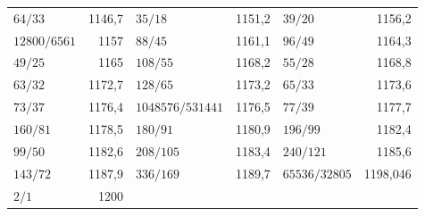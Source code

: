 {\begin{longtable}{l r @{\qquad} l r @{\qquad} l r}
$64/33$ & 1146{,}7 & $35/18$ & 1151{,}2 & $39/20$ & 1156{,}2 \\
$12800/6561$ & 1157 & $88/45$ & 1161{,}1 & $96/49$ & 1164{,}3 \\
$49/25$ & 1165 & $108/55$ & 1168{,}2 & $55/28$ & 1168{,}8 \\
$63/32$ & 1172{,}7 & $128/65$ & 1173{,}2 & $65/33$ & 1173{,}6 \\
$73/37$ & 1176{,}4 & $1048576/531441$ & 1176{,}5 & $77/39$ & 1177{,}7 \\
$160/81$ & 1178{,}5 & $180/91$ & 1180{,}9 & $196/99$ & 1182{,}4 \\
$99/50$ & 1182{,}6 & $208/105$ & 1183{,}4 & $240/121$ & 1185{,}6 \\
$143/72$ & 1187{,}9 & $336/169$ & 1189{,}7 & $65536/32805$ & 1198{,}046 \\
$2/1$ & 1200 &  &  &  &  \\
\end{longtable}
}


